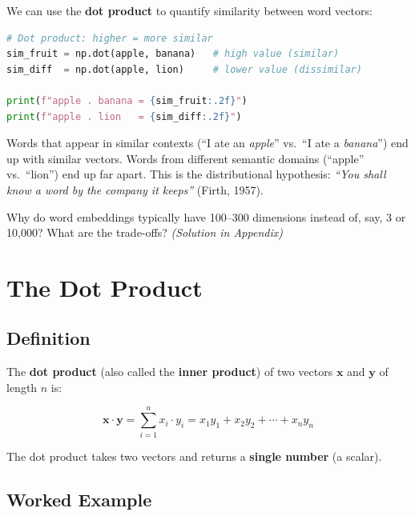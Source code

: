 \documentclass[11pt,a4paper]{article}
\begin{document}
We can use the \textbf{dot product} to quantify similarity between word vectors:

\begin{lstlisting}[language=Python]
# Dot product: higher = more similar
sim_fruit = np.dot(apple, banana)   # high value (similar)
sim_diff  = np.dot(apple, lion)     # lower value (dissimilar)

print(f"apple . banana = {sim_fruit:.2f}")
print(f"apple . lion   = {sim_diff:.2f}")
\end{lstlisting}

\begin{tcolorbox}[intuitionbox={Intuition}]
Words that appear in similar contexts (``I ate an \textit{apple}'' vs.\ ``I ate a \textit{banana}'') end up with similar vectors. Words from different semantic domains (``apple'' vs.\ ``lion'') end up far apart. This is the distributional hypothesis: \textit{``You shall know a word by the company it keeps''} (Firth, 1957).
\end{tcolorbox}

\begin{tcolorbox}[questionbox={Self-Check Q2}]
Why do word embeddings typically have 100--300 dimensions instead of, say, 3 or 10{,}000? What are the trade-offs? \textit{(Solution in Appendix)}
\end{tcolorbox}

\section{The Dot Product}

\subsection{Definition}

The \textbf{dot product} (also called the \textbf{inner product}) of two vectors $\mathbf{x}$ and $\mathbf{y}$ of length $n$ is:

\begin{equation}
\boxed{\mathbf{x} \cdot \mathbf{y} = \sum_{i=1}^{n} x_i \cdot y_i = x_1 y_1 + x_2 y_2 + \cdots + x_n y_n}
\end{equation}

The dot product takes two vectors and returns a \textbf{single number} (a scalar).

\subsection{Worked Example}
\end{document}
